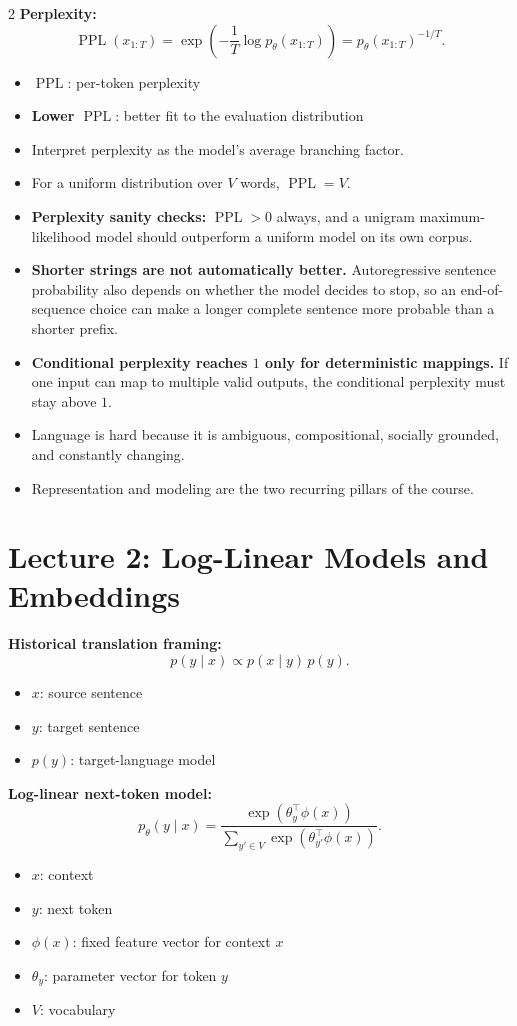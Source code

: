 \documentclass[10pt]{article}
\newcommand{\PPL}{\operatorname{PPL}}
\newenvironment{symdefs}{\begin{itemize}[leftmargin=1.1em, topsep=1pt, itemsep=0pt, parsep=0pt]}{\end{itemize}}
\newcommand{\sym}[2]{\item \textbf{#1}: #2}
\begin{document}
\begin{multicols*}{2}
\textbf{Perplexity:}
\[
\PPL(x_{1:T})
=
\exp\left(
-\frac{1}{T}\log p_\theta(x_{1:T})
\right)
=
p_\theta(x_{1:T})^{-1/T}.
\]
\begin{symdefs}
\sym{\(\PPL\)}{per-token perplexity}
\sym{Lower \(\PPL\)}{better fit to the evaluation distribution}
\end{symdefs}

\begin{itemize}
\item Interpret perplexity as the model's average branching factor.
\item For a uniform distribution over \(V\) words, \(\PPL=V\).
\item \textbf{Perplexity sanity checks:} \(\PPL>0\) always, and a unigram maximum-likelihood model should outperform a uniform model on its own corpus.
\item \textbf{Shorter strings are not automatically better.} Autoregressive sentence probability also depends on whether the model decides to stop, so an end-of-sequence choice can make a longer complete sentence more probable than a shorter prefix.
\item \textbf{Conditional perplexity reaches \(1\) only for deterministic mappings.} If one input can map to multiple valid outputs, the conditional perplexity must stay above \(1\).
\item Language is hard because it is ambiguous, compositional, socially grounded, and constantly changing.
\item Representation and modeling are the two recurring pillars of the course.
\end{itemize}

\section*{Lecture 2: Log-Linear Models and Embeddings}
\textbf{Historical translation framing:}
\[
p(y \mid x) \propto p(x \mid y)\,p(y).
\]
\begin{symdefs}
\sym{\(x\)}{source sentence}
\sym{\(y\)}{target sentence}
\sym{\(p(y)\)}{target-language model}
\end{symdefs}

\textbf{Log-linear next-token model:}
\[
p_\theta(y \mid x)
=
\frac{\exp(\theta_y^\top \phi(x))}
{\sum_{y' \in V}\exp(\theta_{y'}^\top \phi(x))}.
\]
\begin{symdefs}
\sym{\(x\)}{context}
\sym{\(y\)}{next token}
\sym{\(\phi(x)\)}{fixed feature vector for context \(x\)}
\sym{\(\theta_y\)}{parameter vector for token \(y\)}
\sym{\(V\)}{vocabulary}
\end{symdefs}


\end{multicols*}
\end{document}
